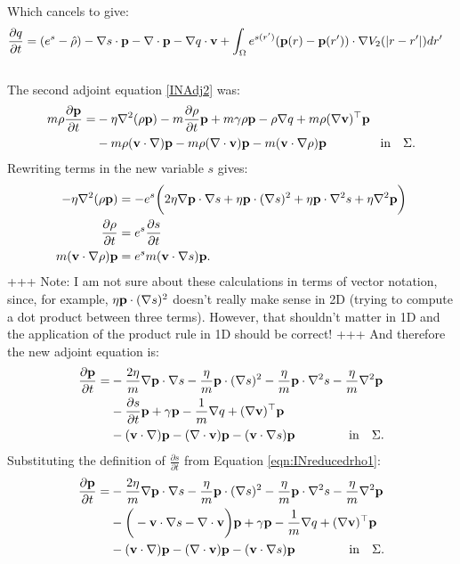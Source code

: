 Which cancels to give:
\begin{align*}
& \frac{\partial q}{\partial t} = (e^s - \hat \rho)  - \nabla s \cdot \mathbf{p} -\nabla\cdot \mathbf{p}  -  \nabla q \cdot \mathbf{v}   + \int_\Omega  e^{s(r')}(\mathbf{p}(r) - \mathbf{p}(r')) \cdot\nabla V_2(|r-r'|)   dr' 
\end{align*}
\\
The second adjoint equation \ref{INAdj2} was:
\begin{align*}
m\rho \frac{\partial \mathbf{p}}{\partial t} =& - \eta \nabla^2 (\rho \mathbf{p}) - m \frac{\partial \rho}{\partial t} \mathbf{p}   +m \gamma \rho \mathbf{p}-\rho\nabla q +m \rho (\nabla \mathbf{v})^\top\mathbf{p} \\
&-m \rho (\mathbf{v} \cdot \nabla)\mathbf{p} - m \rho (\nabla \cdot \mathbf{v})\mathbf{p}  - m (\mathbf{v} \cdot \nabla \rho)\mathbf{p}  \ \qquad\qquad \text{in} \quad \Sigma.
\end{align*}
Rewriting terms in the new variable $s$ gives:
\begin{align*}
- \eta \nabla^2 (\rho \mathbf{p}) &= - e^s \bigg(2 \eta \nabla \mathbf{p} \cdot \nabla s + \eta \mathbf{p} \cdot (\nabla s)^2 + \eta \mathbf{p} \cdot \nabla^2 s + \eta \nabla^2 \mathbf{p}    \bigg)\\
\frac{\partial \rho}{\partial t} &= e^s \frac{\partial s}{\partial t}\\
m (\mathbf{v} \cdot \nabla \rho) \mathbf{p} &= e^s m (\mathbf{v} \cdot \nabla s) \mathbf{p}.
\end{align*}
+++ Note: I am not sure about these calculations in terms of vector notation, since, for example, $\eta \mathbf{p} \cdot (\nabla s)^2$ doesn't really make sense in 2D (trying to compute a dot product between three terms). However, that shouldn't matter in 1D and the application of the product rule in 1D should be correct! +++
And therefore the new adjoint equation is:
\begin{align*}
\frac{\partial \mathbf{p}}{\partial t} =& 
- \frac{2 \eta}{m} \nabla \mathbf{p} \cdot \nabla s - \frac{\eta}{m} \mathbf{p} \cdot (\nabla s)^2 - \frac{\eta}{m} \mathbf{p} \cdot \nabla^2 s - \frac{\eta}{m} \nabla^2 \mathbf{p} \\
 &- \frac{\partial s}{\partial t} \mathbf{p}   +\gamma  \mathbf{p}-\frac{1}{m} \nabla q + (\nabla \mathbf{v})^\top\mathbf{p} \\
&- (\mathbf{v} \cdot \nabla)\mathbf{p} -  (\nabla \cdot \mathbf{v})\mathbf{p}  -  (\mathbf{v} \cdot \nabla s)\mathbf{p}  \ \qquad\qquad \text{in} \quad \Sigma.
\end{align*}
Substituting the definition of $\frac{\partial s}{\partial t} $ from Equation \ref{eqn:INreducedrho1}:
\begin{align*}
\frac{\partial \mathbf{p}}{\partial t} =& 
- \frac{2 \eta}{m} \nabla \mathbf{p} \cdot \nabla s - \frac{\eta}{m} \mathbf{p} \cdot (\nabla s)^2 - \frac{\eta}{m} \mathbf{p} \cdot \nabla^2 s - \frac{\eta}{m} \nabla^2 \mathbf{p} \\
&- \bigg(- \mathbf{v} \cdot \nabla s - \nabla \cdot \mathbf{v}\bigg)\mathbf{p}   +\gamma  \mathbf{p}-\frac{1}{m} \nabla q + (\nabla \mathbf{v})^\top\mathbf{p} \\
&- (\mathbf{v} \cdot \nabla)\mathbf{p} -  (\nabla \cdot \mathbf{v})\mathbf{p}  -  (\mathbf{v} \cdot \nabla s)\mathbf{p}  \ \qquad\qquad \text{in} \quad \Sigma.
\end{align*}
